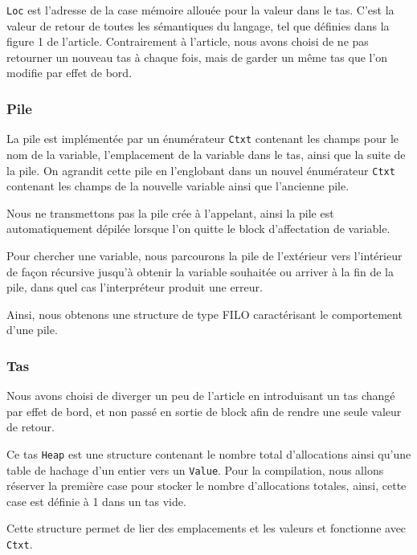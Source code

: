 \documentclass{rapportECL}
\begin{document}
\verb|Loc| est l'adresse de la case mémoire allouée pour la valeur dans le tas. C'est la valeur de retour de toutes les sémantiques 
du langage, tel que définies dans la figure 1 de l'article\cite{ullrich_counting_2020}.
Contrairement à l'article, nous avons choisi de ne pas retourner un nouveau tas à chaque fois, mais de garder un même tas que 
l'on modifie par effet de bord.

\medskip

\subsubsection{Pile}

La pile est implémentée par un énumérateur \verb|Ctxt| contenant les champs pour le nom de la variable, 
l'emplacement de la variable dans le tas, ainsi que la suite de la pile. 
On agrandit cette pile en l'englobant dans un nouvel énumérateur \verb|Ctxt| contenant les champs 
de la nouvelle variable ainsi que l'ancienne pile. 

Nous ne transmettons pas la pile crée à l'appelant, ainsi la pile est automatiquement dépilée lorsque l'on quitte le 
block d'affectation de variable.

Pour chercher une variable, nous parcourons la pile de l'extérieur vers l'intérieur de façon récursive jusqu'à obtenir la variable 
souhaitée ou arriver à la fin de la pile, dans quel cas l'interpréteur produit une erreur.

Ainsi, nous obtenons une structure de type FILO caractérisant le comportement d'une pile.

\medskip

\subsubsection{Tas}

Nous avons choisi de diverger un peu de l'article\cite{ullrich_counting_2020} en introduisant un tas changé par effet de bord, 
et non passé en sortie de block afin de rendre une seule valeur de retour.

Ce tas \verb|Heap| est une structure contenant le nombre total d'allocations ainsi qu'une table de hachage d'un entier 
vers un \verb|Value|. Pour la compilation, nous allons réserver la première case pour stocker le nombre d'allocations totales,
ainsi, cette case est définie à 1 dans un tas vide.

Cette structure permet de lier des emplacements et les valeurs et fonctionne avec \verb|Ctxt|. 
\end{document}
